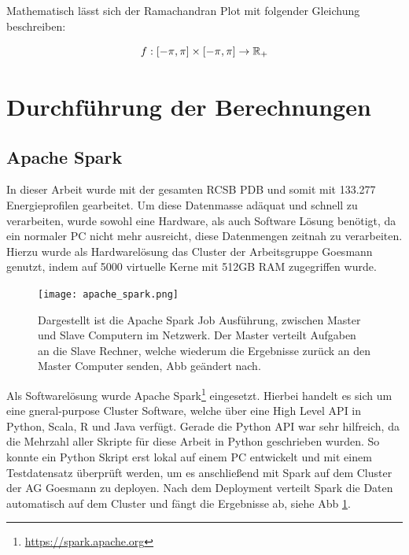 Mathematisch lässt sich der Ramachandran Plot mit folgender Gleichung beschreiben:

\begin{equation}
    f : [-\pi,\pi]\times[-\pi,\pi] \rightarrow \mathbb{R}_{+}
    \label{eq:rama_eq}
\end{equation}



\section{Durchführung der Berechnungen}


\subsection{Apache Spark}
In dieser Arbeit wurde mit der gesamten RCSB \ac{PDB} und somit mit 133.277 Energieprofilen gearbeitet. Um diese Datenmasse adäquat und schnell zu verarbeiten, wurde sowohl eine Hardware, als auch Software Lösung benötigt, da ein normaler PC nicht mehr ausreicht, diese Datenmengen zeitnah zu verarbeiten. Hierzu wurde als Hardwarelösung das Cluster der Arbeitsgruppe Goesmann genutzt, indem auf 5000 virtuelle Kerne mit 512GB RAM zugegriffen wurde. 

\begin{figure}[H]
\texttt{[image: apache\_spark.png]}
\caption{Dargestellt ist die Apache Spark Job Ausführung, zwischen Master und Slave Computern im Netzwerk. Der Master verteilt Aufgaben an die Slave Rechner, welche wiederum die Ergebnisse zurück an den Master Computer senden, \ac{Abb} geändert nach\protect\footnotemark.}
\label{fig:apache_spark}
\end{figure}

Als Softwarelösung wurde Apache Spark\footnote{\url{https://spark.apache.org}} eingesetzt. Hierbei handelt es sich um eine gneral-purpose Cluster Software, welche über eine High Level API in Python, Scala, R und Java verfügt. Gerade die Python API war sehr hilfreich, da die Mehrzahl aller Skripte für diese Arbeit in Python geschrieben wurden. So konnte ein Python Skript erst lokal auf einem PC entwickelt und mit einem Testdatensatz überprüft werden, um es anschließend mit Spark auf dem Cluster der AG Goesmann zu deployen. Nach dem Deployment verteilt Spark die Daten automatisch auf dem Cluster und fängt die Ergebnisse ab, siehe \ac{Abb} \ref{fig:apache_spark}. 

